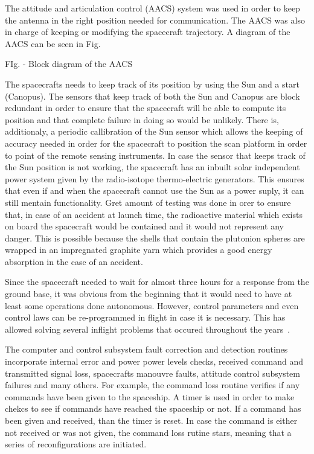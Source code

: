 The attitude and articulation control (AACS) system was used in order to keep
the antenna in the right position needed for communication. The AACS was also
in charge of keeping or modifying the spacecraft trajectory. A diagram of the
AACS can be seen in Fig.

FIg. - Block diagram of the AACS


The spacecrafts needs to keep track of its position by using the Sun and a start
(Canopus). The sensors that keep track of both the Sun and Canopus are block
redundant in order to ensure that the spacecraft will be able to compute its
position and that complete failure in doing so would be unlikely. There is,
additionaly, a periodic callibration of the Sun sensor which allows the keeping
of accuracy needed in order for the spacecraft to position the scan platform in
order to point of the remote sensing instruments. In case the sensor that keeps
track of the Sun position is not working, the spacecraft has an inbuilt solar
independent power system given by the radio-isotope thermo-electric generators.
This ensures that even if and when the spacecraft cannot use the Sun as a power
suply, it can still mentain functionality. Gret amount of testing was done in
orer to ensure that, in case of an accident at launch time, the radioactive
material which exists on board the spacecraft would be contained and it would
not represent any danger. This is possible because the shells that contain the
plutonion spheres are wrapped in an impregnated graphite yarn which provides a
good energy absorption in the case of an accident.

Since the spacecraft needed to wait for almost three hours for a response from
the ground base, it was obvious from the beginning that it would need to have at
least some operations done autonomous. However, control parameters and even
control laws can be re-programmed in flight in case it is necessary. This has
allowed solving several inflight problems that occured throughout the
years~\cite{litty}.

The computer and control subsystem fault correction and detection routines
incorporate internal error and power power levels checks, received command and
transmitted signal loss, spacecrafts manouvre faults, attitude control subsystem
failures and many others. For example, the command loss routine verifies if any
commands have been given to the spaceship. A timer is used in order to make
chekcs to see if commands have reached the spaceship or not. If a command has
been given and received, than the timer is reset. In case the command is either
not received or was not given, the command loss rutine stars, meaning that a
series of reconfigurations are initiated.

